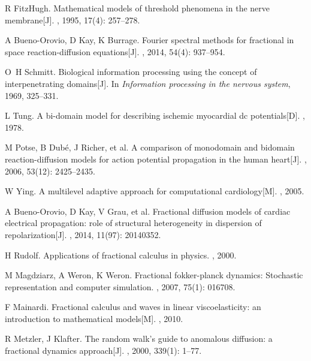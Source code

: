\documentclass[twoside,UTF8]{nputhesis}
\begin{document}
\begin{thebibliography}{99}
	R FitzHugh.
	\newblock Mathematical models of threshold phenomena in the nerve membrane[J].
	, 1995, 17(4): 257--278.
	
	A Bueno-Orovio, D Kay, K Burrage.
	\newblock Fourier spectral methods for fractional in space reaction-diffusion
	equations[J].
	, 2014, 54(4): 937--954.
	
	O~H Schmitt.
	\newblock Biological information processing using the concept of
	interpenetrating domains[J].
	\newblock In {\em Information processing in the nervous system}, 1969, 325--331.
	
	L Tung.
	\newblock  A bi-domain model for describing ischemic myocardial dc
	potentials[D].
	, 1978.
	
	M Potse, B Dub{\'e}, J Richer, et al.
	\newblock A comparison of monodomain and bidomain reaction-diffusion models for
	action potential propagation in the human heart[J].
	, 2006, 53(12): 2425--2435.
	
	W Ying.
	\newblock A multilevel adaptive approach for computational cardiology[M].
	, 2005.
	
	A Bueno-Orovio, D Kay, V Grau, et al.
	\newblock Fractional diffusion models of cardiac electrical propagation: role
	of structural heterogeneity in dispersion of repolarization[J].
	, 2014, 11(97): 20140352.
	
	
	H Rudolf.
	\newblock Applications of fractional calculus in physics.
	, 2000.
	
	M Magdziarz, A Weron, K Weron.
	\newblock Fractional fokker-planck dynamics: Stochastic representation and
	computer simulation.
	, 2007, 75(1): 016708.
	
	F Mainardi.
	\newblock Fractional calculus and waves in linear viscoelasticity: an
	introduction to mathematical models[M].
	, 2010.
	
	
	R Metzler, J Klafter.
	\newblock The random walk's guide to anomalous diffusion: a fractional dynamics
	approach[J].
	, 2000, 339(1): 1--77.
	

\end{thebibliography}
\end{document}
